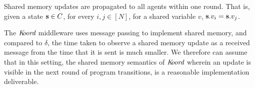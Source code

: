 \begin{assumption}
    \label{shared}
    Shared memory updates are propagated to all agents within one round. That is, given a state ${\textbf{s}}\in C$, for every  $i,j \in [N]$, for a shared variable $v$, ${\textbf{s}}.v_i = {\textbf{s}}.v_j$.
\end{assumption}
The $\emph{K\kern-2pt oord}$ middleware uses message passing to implement shared memory, and compared to $\delta$, the time taken to observe a shared memory update as a received message from the time that it is sent is much smaller. We therefore can assume that in this setting, the shared memory semantics of $\emph{K\kern-2pt oord}$ wherein an update is visible in the next round of program transitions, is a reasonable implementation deliverable.








%

